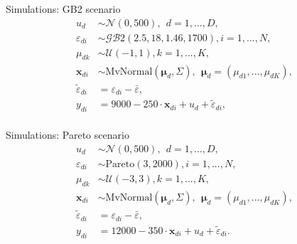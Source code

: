 \begin{frame}{Simulations: GB2 scenario}
    \vspace{-1cm}
    \begin{equation}
        \begin{split}
            u_d & \sim \mathcal N(0, 500), ~~ d = 1,...,D,\\
            \varepsilon_{di} & \sim \mathcal{GB}2(2.5, 18, 1.46, 1700), i = 1,...,N,\\
            \mu_{dk} & \sim \mathcal{U}(-1, 1), k = 1,...,K,\\
            \boldsymbol x_{di}  &\sim \text{MvNormal} (\boldsymbol \mu_{d}, \Sigma) ,
            ~~ \boldsymbol \mu_{d} = (\mu_{d1}, ..., \mu_{dK}),\\
            \tilde{\varepsilon}_{di} & = \varepsilon_{di} - \bar \varepsilon,  \\
            y_{di} & = 9000 - 250 \cdot \boldsymbol x_{di} + u_d + \tilde \varepsilon_{di}, \\
        \end{split}
        \label{eq:gb2_scenario}
    \end{equation}

\end{frame}

\begin{frame}{Simulations: Pareto scenario}
    \vspace{-1cm}
    \begin{equation}
        \begin{split}
            u_d & \sim \mathcal N(0, 500), ~~ d = 1,...,D,\\
            \varepsilon_{di} & \sim \text{Pareto}(3, 2000), i = 1,...,N,\\
            \mu_{dk} & \sim \mathcal{U}(-3, 3), k = 1,...,K,\\
            \boldsymbol x_{di}  &\sim \text{MvNormal} (\boldsymbol \mu_{d}, \Sigma) ,
            ~~ \boldsymbol \mu_{d} = (\mu_{d1}, ..., \mu_{dK}),\\
            \tilde{\varepsilon}_{di} & = \varepsilon_{di} - \bar \varepsilon,  \\
            y_{di} & = 12000 - 350 \cdot \boldsymbol x_{di}    + u_d + \tilde \varepsilon_{di}.\\
        \end{split}
        \label{eq:pareto_scenario}
    \end{equation}

\end{frame}

